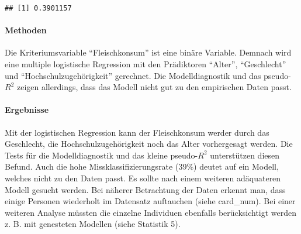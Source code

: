\documentclass[]{article}
\let\oldparagraph\paragraph
\renewcommand{\paragraph}[1]{\oldparagraph{#1}\mbox{}}
\begin{document}
\begin{verbatim}
## [1] 0.3901157
\end{verbatim}

\paragraph{Methoden}\label{methoden}

Die Kriteriumsvariable ``Fleischkonsum'' ist eine binäre Variable.
Demnach wird eine multiple logistische Regression mit den Prädiktoren
``Alter'', ``Geschlecht'' und ``Hochschulzugehörigkeit'' gerechnet. Die
Modelldiagnostik und das pseudo-\(R^2\) zeigen allerdings, dass das
Modell nicht gut zu den empirischen Daten passt.

\paragraph{Ergebnisse}\label{ergebnisse}

Mit der logistischen Regression kann der Fleischkonsum werder durch das
Geschlecht, die Hochschulzugehörigkeit noch das Alter vorhergesagt
werden. Die Tests für die Modelldiagnostik und das kleine pseudo-\(R^2\)
unterstützen diesen Befund. Auch die hohe Missklassifizierungsrate
(39\%) deutet auf ein Modell, welches nicht zu den Daten passt. Es
sollte nach einem weiteren adäquateren Modell gesucht werden. Bei
näherer Betrachtung der Daten erkennt man, dass einige Personen
wiederholt im Datensatz auftauchen (siehe card\_num). Bei einer weiteren
Analyse müssten die einzelne Individuen ebenfalls berücksichtigt werden
z. B. mit genesteten Modellen (siehe Statistik 5).
\end{document}
